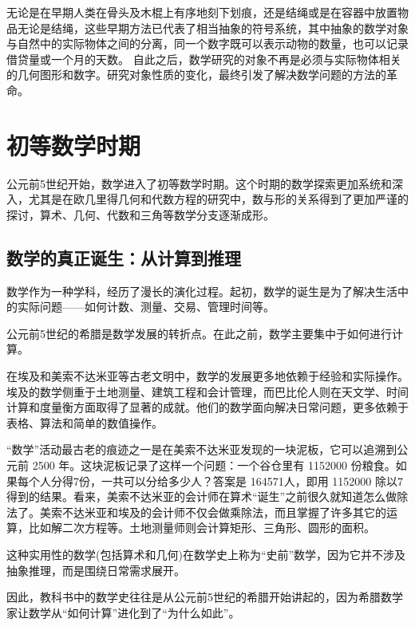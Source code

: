 无论是在早期人类在骨头及木棍上有序地刻下划痕，还是结绳或是在容器中放置物品无论是结绳，这些早期方法已代表了相当抽象的符号系统，其中抽象的数学对象与自然中的实际物体之间的分离，同一个数字既可以表示动物的数量，也可以记录借贷量或一个月的天数。
自此之后，数学研究的对象不再是必须与实际物体相关的几何图形和数字。研究对象性质的变化，最终引发了解决数学问题的方法的革命。

\section{初等数学时期}
公元前5世纪开始，数学进入了初等数学时期。这个时期的数学探索更加系统和深入，尤其是在欧几里得几何和代数方程的研究中，数与形的关系得到了更加严谨的探讨，算术、几何、代数和三角等数学分支逐渐成形。

\subsection{数学的真正诞生：从计算到推理}
数学作为一种学科，经历了漫长的演化过程。起初，数学的诞生是为了解决生活中的实际问题——如何计数、测量、交易、管理时间等。

公元前5世纪的希腊是数学发展的转折点。在此之前，数学主要集中于如何进行计算。

在埃及和美索不达米亚等古老文明中，数学的发展更多地依赖于经验和实际操作。埃及的数学侧重于土地测量、建筑工程和会计管理，而巴比伦人则在天文学、时间计算和度量衡方面取得了显著的成就。他们的数学面向解决日常问题，更多依赖于表格、算法和简单的数值操作。

“数学”活动最古老的痕迹之一是在美索不达米亚发现的一块泥板，它可以追溯到公元前 2500 年。这块泥板记录了这样一个问题：一个谷仓里有 1152000 份粮食。如果每个人分得7份，一共可以分给多少人？答案是 164571人，即用 1152000 除以7得到的结果。看来，美索不达米亚的会计师在算术“诞生”之前很久就知道怎么做除法了。美索不达米亚和埃及的会计师不仅会做乘除法，而且掌握了许多其它的运算，比如解二次方程等。土地测量师则会计算矩形、三角形、圆形的面积。

这种实用性的数学(包括算术和几何)在数学史上称为“史前”数学，因为它并不涉及抽象推理，而是围绕日常需求展开。
	
因此，教科书中的数学史往往是从公元前5世纪的希腊开始讲起的，因为希腊数学家让数学从“如何计算”进化到了“为什么如此”。

